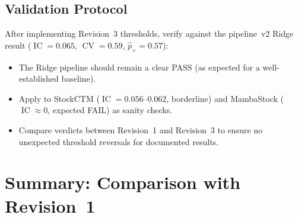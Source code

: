 \documentclass[11pt,a4paper]{article}
\theoremstyle{definition}
\newcommand{\IC}{\operatorname{IC}}
\newcommand{\CV}{\operatorname{CV}}
\begin{document}
\subsection{Validation Protocol}

After implementing Revision~3 thresholds, verify against the pipeline~v2
Ridge result ($\IC=0.065$, $\CV=0.59$, $\hat{p}_{+}=0.57$):
\begin{itemize}[nosep]
    \item The Ridge pipeline should remain a clear PASS (as expected
          for a well-established baseline).
    \item Apply to StockCTM ($\IC=0.056$--$0.062$, borderline) and
          MambaStock ($\IC \approx 0$, expected FAIL) as sanity checks.
    \item Compare verdicts between Revision~1 and Revision~3 to ensure
          no unexpected threshold reversals for documented results.
\end{itemize}

\section{Summary: Comparison with Revision~1}
\label{sec:comparison}
\end{document}
